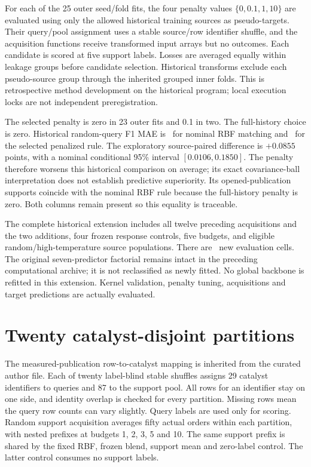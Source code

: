 For each of the 25 outer seed/fold fits, the four penalty values $\{0,0.1,1,10\}$ are evaluated using only the allowed historical training sources as pseudo-targets. Their query/pool assignment uses a stable source/row identifier shuffle, and the acquisition functions receive transformed input arrays but no outcomes. Each candidate is scored at five support labels. Losses are averaged equally within leakage groups before candidate selection. Historical transforms exclude each pseudo-source group through the inherited grouped inner folds. This is retrospective method development on the historical program; local execution locks are not independent preregistration.

The selected penalty is zero in 23 outer fits and 0.1 in two. The full-history choice is zero. Historical random-query F1 MAE is \RbfMatchMae\ for nominal RBF matching and \RobustMae\ for the selected penalized rule. The exploratory source-paired difference is $+0.0855$ points, with a nominal conditional 95\% interval $[0.0106,0.1850]$. The penalty therefore worsens this historical comparison on average; its exact covariance-ball interpretation does not establish predictive superiority. Its opened-publication supports coincide with the nominal RBF rule because the full-history penalty is zero. Both columns remain present so this equality is traceable.

The complete historical extension includes all twelve preceding acquisitions and the two additions, four frozen response controls, five budgets, and eligible random/high-temperature source populations. There are \HistoricalCells\ new evaluation cells. The original seven-predictor factorial remains intact in the preceding computational archive; it is not reclassified as newly fitted. No global backbone is refitted in this extension. Kernel validation, penalty tuning, acquisitions and target predictions are actually evaluated.

\section{Twenty catalyst-disjoint partitions}
The measured-publication row-to-catalyst mapping is inherited from the curated author file. Each of twenty label-blind stable shuffles assigns 29 catalyst identifiers to queries and 87 to the support pool. All rows for an identifier stay on one side, and identity overlap is checked for every partition. Missing rows mean the query row counts can vary slightly. Query labels are used only for scoring. Random support acquisition averages fifty actual orders within each partition, with nested prefixes at budgets 1, 2, 3, 5 and 10. The same support prefix is shared by the fixed RBF, frozen blend, support mean and zero-label control. The latter control consumes no support labels.


